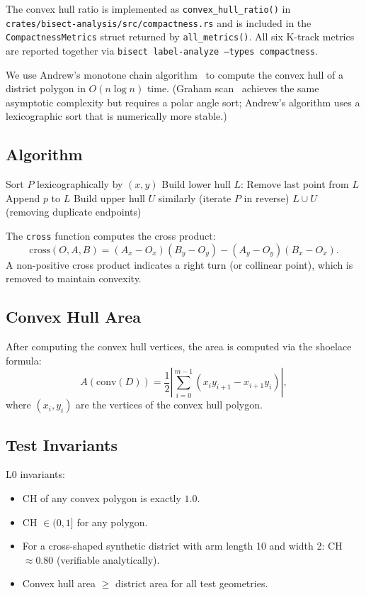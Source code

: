 The convex hull ratio is implemented as \texttt{convex\_hull\_ratio()} in
\texttt{crates/bisect-analysis/src/compactness.rs} and is included in the
\texttt{CompactnessMetrics} struct returned by \texttt{all\_metrics()}.
All six K-track metrics are reported together via \texttt{bisect label-analyze --types compactness}.

We use Andrew's monotone chain algorithm~\citep{andrew1979another} to compute
the convex hull of a district polygon in $O(n \log n)$ time.
(Graham scan~\citep{graham1972efficient} achieves the same asymptotic complexity
but requires a polar angle sort; Andrew's algorithm uses a lexicographic sort
that is numerically more stable.)

\subsection{Algorithm}

\begin{algorithm}
\caption{Andrew's Monotone Chain Convex Hull}
\label{alg:monotone}
\begin{algorithmic}[1]
  \State Sort $P$ lexicographically by $(x, y)$
  \State Build lower hull $L$:
      \State Remove last point from $L$
    \EndWhile
    \State Append $p$ to $L$
  \EndFor
  \State Build upper hull $U$ similarly (iterate $P$ in reverse)
  \State \Return $L \cup U$ (removing duplicate endpoints)
\EndFunction
\end{algorithmic}
\end{algorithm}

The \texttt{cross} function computes the cross product:
\[
  \text{cross}(O, A, B) = (A_x - O_x)(B_y - O_y) - (A_y - O_y)(B_x - O_x).
\]
A non-positive cross product indicates a right turn (or collinear point),
which is removed to maintain convexity.

\subsection{Convex Hull Area}

After computing the convex hull vertices, the area is computed via the shoelace formula:
\[
  A(\text{conv}(D)) = \frac{1}{2} \left| \sum_{i=0}^{m-1} (x_i y_{i+1} - x_{i+1} y_i) \right|,
\]
where $(x_i, y_i)$ are the vertices of the convex hull polygon.

\subsection{Test Invariants}

L0 invariants:
\begin{itemize}
  \item CH of any convex polygon is exactly $1.0$.
  \item CH $\in (0, 1]$ for any polygon.
  \item For a cross-shaped synthetic district with arm length 10 and width 2:
    CH $\approx 0.80$ (verifiable analytically).
  \item Convex hull area $\geq$ district area for all test geometries.
\end{itemize}
